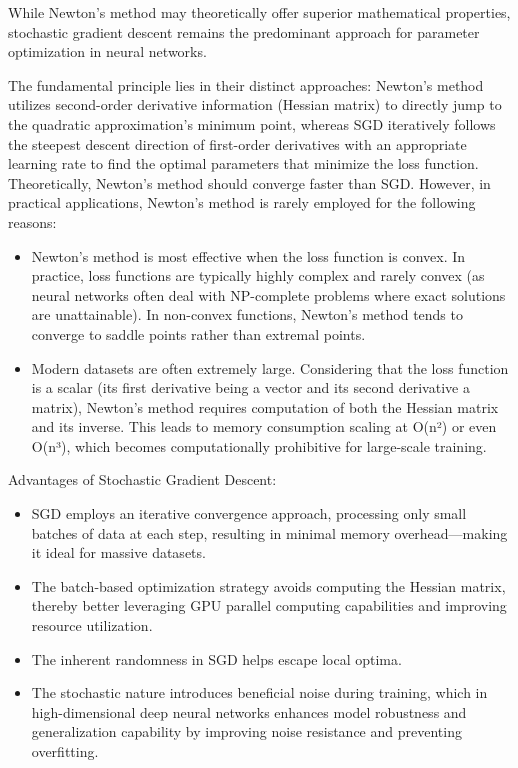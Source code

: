 \documentclass[conference]{IEEEtran}
\begin{document}
While Newton's method may theoretically offer superior mathematical properties, stochastic gradient descent remains the predominant approach for parameter optimization in neural networks.

The fundamental principle lies in their distinct approaches: Newton's method utilizes second-order derivative information (Hessian matrix) to directly jump to the quadratic approximation's minimum point, whereas SGD iteratively follows the steepest descent direction of first-order derivatives with an appropriate learning rate to find the optimal parameters that minimize the loss function. Theoretically, Newton's method should converge faster than SGD. However, in practical applications, Newton's method is rarely employed for the following reasons:
\begin{itemize}
\item Newton's method is most effective when the loss function is convex. In practice, loss functions are typically highly complex and rarely convex (as neural networks often deal with NP-complete problems where exact solutions are unattainable). In non-convex functions, Newton's method tends to converge to saddle points rather than extremal points.

\item Modern datasets are often extremely large. Considering that the loss function is a scalar (its first derivative being a vector and its second derivative a matrix), Newton's method requires computation of both the Hessian matrix and its inverse. This leads to memory consumption scaling at O(n²) or even O(n³), which becomes computationally prohibitive for large-scale training.
\end{itemize}
Advantages of Stochastic Gradient Descent:
\begin{itemize}
\item SGD employs an iterative convergence approach, processing only small batches of data at each step, resulting in minimal memory overhead—making it ideal for massive datasets.

\item The batch-based optimization strategy avoids computing the Hessian matrix, thereby better leveraging GPU parallel computing capabilities and improving resource utilization.

\item The inherent randomness in SGD helps escape local optima.

\item The stochastic nature introduces beneficial noise during training, which in high-dimensional deep neural networks enhances model robustness and generalization capability by improving noise resistance and preventing overfitting.
\end{itemize}
\end{document}

